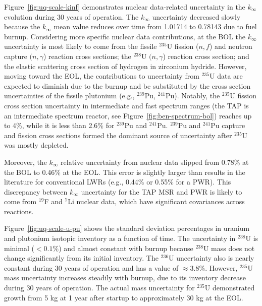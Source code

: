 Figure~\ref{fig:uq-scale-kinf} demonstrates nuclear data-related uncertainty 
in the $k_{\infty}$ evolution during 30 years of operation. The $k_{\infty}$  
uncertainty decreased slowly because the $k_{\infty}$ mean value reduces over 
time from 1.01714 to 0.78143 due to fuel burnup. Considering more specific 
nuclear data contributions, at the \gls{BOL} the $k_{\infty}$ uncertainty is 
most likely to come from the fissile $^{235}$U fission ($n,f$) and neutron 
capture $(n,\gamma$) reaction cross sections; the $^{238}$U $(n,\gamma$) 
reaction cross section; and the elastic scattering cross section of hydrogen 
in zirconium hydride. However, moving toward the \gls{EOL}, the contributions 
to uncertainty from $^{235}$U data are expected to diminish due to the burnup 
and be substituted by the cross section uncertainties of the fissile plutonium 
(e.g., $^{239}$Pu, $^{241}$Pu). Notably, the $^{235}$U fission cross section 
uncertainty in intermediate and fast spectrum ranges (the \gls{TAP} is an
intermediate spectrum reactor, see Figure~\ref{fig:ben-spectrum-bol}) reaches 
up to 4\%, while it is less than 2.6\% for $^{239}$Pu and $^{241}$Pu. 
$^{239}$Pu and $^{241}$Pu capture and fission cross sections formed the 
dominant source of uncertainty after $^{235}$U was mostly depleted. 

Moreover, the $k_{\infty}$ relative uncertainty from nuclear data slipped 
from 0.78\% at the \gls{BOL} to 0.46\% at the \gls{EOL}. This error is 
slightly larger than results in the literature for conventional \glspl{LWR} 
(e.g., 0.44\% \cite{williams_statistical_2013} or 0.55\% 
\cite{campolina_uncertainty_2018} for a \gls{PWR}). This discrepancy between 
$k_{\infty}$ uncertainty for the \gls{TAP} \gls{MSR} and \gls{PWR} is likely 
to come from $^{19}$F and $^{7}$Li nuclear data, which have significant 
covariances across reactions.

Figure~\ref{fig:uq-scale-u-pu} shows the standard deviation percentages in 
uranium and plutonium isotopic inventory as a function of time. The 
uncertainty in 
$^{238}$U is minimal ($<0.1$\%) and almost constant with burnup because 
$^{238}$U mass does not change significantly from its initial inventory. The 
$^{236}$U uncertainty also is nearly constant during 30 years of operation and 
has a value of $\approx3.8$\%. However, $^{235}$U mass uncertainty increases 
steadily with burnup, due to its inventory decrease during 30 years of 
operation. 
The actual mass uncertainty for $^{235}$U demonstrated growth from 5 kg at 1 
year after startup to approximately 30 kg at the \gls{EOL}.

